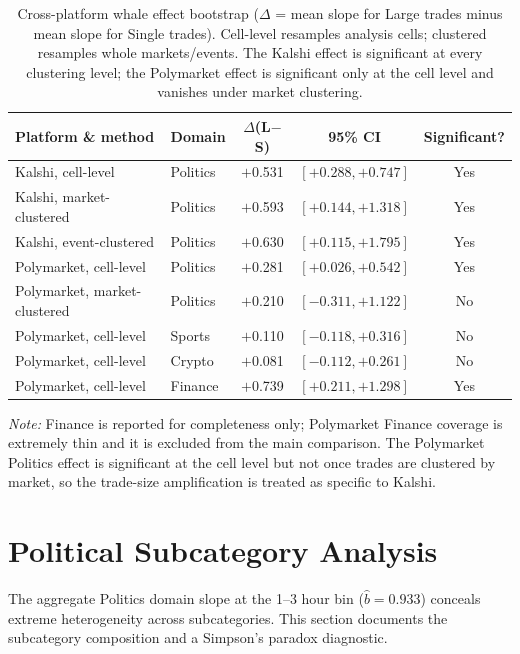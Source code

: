 \documentclass[11pt,a4paper]{article}
\begin{document}
\begin{table}[!ht]
\caption{Cross-platform whale effect bootstrap ($\Delta$ = mean slope for Large trades minus mean slope for Single trades). Cell-level resamples analysis cells; clustered resamples whole markets/events. The Kalshi effect is significant at every clustering level; the Polymarket effect is significant only at the cell level and vanishes under market clustering.\label{tab:cp_whale}}
\centering
\begin{tabular}{llccc}
\toprule
Platform \& method & Domain & $\Delta$(L$-$S) & 95\% CI & Significant? \\
\midrule
Kalshi, cell-level        & Politics & $+$0.531 & $[+0.288, +0.747]$ & Yes \\
Kalshi, market-clustered  & Politics & $+$0.593 & $[+0.144, +1.318]$ & Yes \\
Kalshi, event-clustered   & Politics & $+$0.630 & $[+0.115, +1.795]$ & Yes \\
Polymarket, cell-level    & Politics & $+$0.281 & $[+0.026, +0.542]$ & Yes \\
Polymarket, market-clustered & Politics & $+$0.210 & $[-0.311, +1.122]$ & No  \\
Polymarket, cell-level    & Sports   & $+$0.110 & $[-0.118, +0.316]$ & No  \\
Polymarket, cell-level    & Crypto   & $+$0.081 & $[-0.112, +0.261]$ & No  \\
Polymarket, cell-level    & Finance  & $+$0.739 & $[+0.211, +1.298]$ & Yes \\
\bottomrule
\end{tabular}
\begin{flushleft}
\small\textit{Note:} Finance is reported for completeness only; Polymarket Finance coverage is extremely thin and it is excluded from the main comparison. The Polymarket Politics effect is significant at the cell level but not once trades are clustered by market, so the trade-size amplification is treated as specific to Kalshi.
\end{flushleft}
\end{table}

\section{Political Subcategory Analysis}\label{sec:political}

The aggregate Politics domain slope at the 1--3 hour bin ($\hat{b} = 0.933$) conceals extreme heterogeneity across subcategories. This section documents the subcategory composition and a Simpson's paradox diagnostic.
\end{document}
